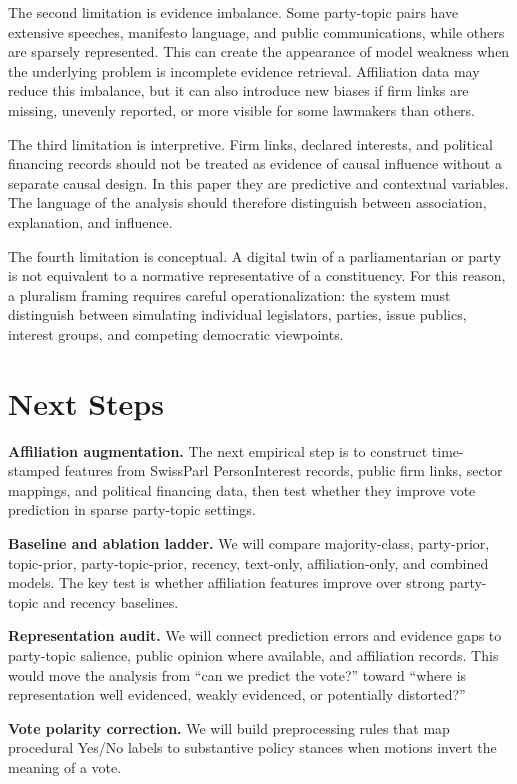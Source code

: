 \documentclass[letterpaper]{article}
\begin{document}
The second limitation is evidence imbalance. Some party-topic pairs have extensive speeches, manifesto language, and public communications, while others are sparsely represented. This can create the appearance of model weakness when the underlying problem is incomplete evidence retrieval. Affiliation data may reduce this imbalance, but it can also introduce new biases if firm links are missing, unevenly reported, or more visible for some lawmakers than others.

The third limitation is interpretive. Firm links, declared interests, and political financing records should not be treated as evidence of causal influence without a separate causal design. In this paper they are predictive and contextual variables. The language of the analysis should therefore distinguish between association, explanation, and influence.

The fourth limitation is conceptual. A digital twin of a parliamentarian or party is not equivalent to a normative representative of a constituency. For this reason, a pluralism framing requires careful operationalization: the system must distinguish between simulating individual legislators, parties, issue publics, interest groups, and competing democratic viewpoints.

\section{Next Steps}

\textbf{Affiliation augmentation.} The next empirical step is to construct time-stamped features from SwissParl PersonInterest records, public firm links, sector mappings, and political financing data, then test whether they improve vote prediction in sparse party-topic settings.

\textbf{Baseline and ablation ladder.} We will compare majority-class, party-prior, topic-prior, party-topic-prior, recency, text-only, affiliation-only, and combined models. The key test is whether affiliation features improve over strong party-topic and recency baselines.

\textbf{Representation audit.} We will connect prediction errors and evidence gaps to party-topic salience, public opinion where available, and affiliation records. This would move the analysis from ``can we predict the vote?'' toward ``where is representation well evidenced, weakly evidenced, or potentially distorted?''

\textbf{Vote polarity correction.} We will build preprocessing rules that map procedural Yes/No labels to substantive policy stances when motions invert the meaning of a vote.
\end{document}
